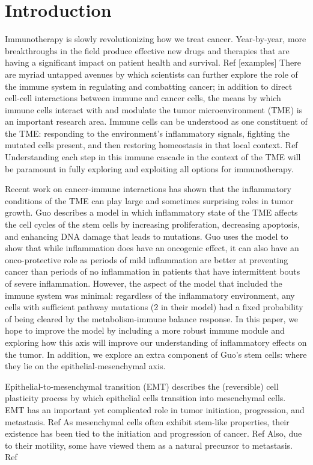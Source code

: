 \documentclass{article}
\begin{document}
\section{Introduction}
Immunotherapy is slowly revolutionizing how we treat cancer.
Year-by-year, more breakthroughs in the field produce effective new drugs and therapies that are having a significant impact on patient health and survival. Ref  [examples] 
There are myriad untapped avenues by which scientists can further explore the role of the immune system in regulating and combatting cancer; in addition to direct cell-cell interactions between immune and cancer cells, the means by which immune cells interact with and modulate the tumor microenvironment (TME) is an important research area. Immune cells can be understood as one constituent of the TME: responding to the environment's inflammatory signals, fighting the mutated cells present, and then restoring homeostasis in that local context. Ref
Understanding each step in this immune cascade in the context of the TME will be paramount in fully exploring and exploiting all options for immunotherapy.

Recent work on cancer-immune interactions has shown that the inflammatory conditions of the TME can play large and sometimes surprising roles in tumor growth.
Guo describes a model in which inflammatory state of the TME affects the cell cycles of the stem cells by increasing proliferation, decreasing apoptosis, and enhancing DNA damage that leads to mutations.
Guo uses the model to show that while inflammation does have an oncogenic effect, it can also have an onco-protective role as periods of mild inflammation are better at preventing cancer than periods of no inflammation in patients that have intermittent bouts of severe inflammation.
However, the aspect of the model that included the immune system was minimal: regardless of the inflammatory environment, any cells with sufficient pathway mutations (2 in their model) had a fixed probability of being cleared by the metabolism-immune balance response. 
In this paper, we hope to improve the model by including a more robust immune module and exploring how this axis will improve our understanding of inflammatory effects on the tumor.
In addition, we explore an extra component of Guo's stem cells: where they lie on the epithelial-mesenchymal axis.

Epithelial-to-mesenchymal transition (EMT) describes the (reversible) cell plasticity process by which epithelial cells transition into mesenchymal cells. EMT has an important yet complicated role in tumor initiation, progression, and metastasis. Ref 
As mesenchymal cells often exhibit stem-like properties, their existence has been tied to the initiation and progression of cancer. Ref
Also, due to their motility, some have viewed them as a natural precursor to metastasis. Ref 
\end{document}
